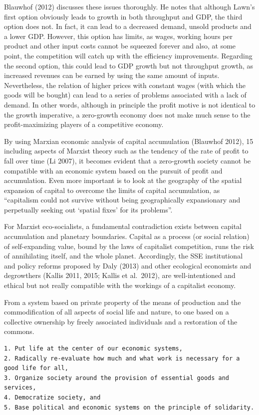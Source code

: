 \documentclass[
]{book}
\begin{document}
Blauwhof (2012) discusses these issues thoroughly. He notes that although Lawn's first option obviously
leads to growth in both throughput and GDP, the third option does not. In fact, it can lead to a decreased demand,
unsold products and a lower GDP. However, this option has limits, as wages, working hours per product and
other input costs cannot be squeezed forever and also, at some point, the competition will catch up with the
efficiency improvements. Regarding the second option, this could lead to GDP growth but not throughput
growth, as increased revenues can be earned by using the same amount of inputs. Nevertheless, the relation of
higher prices with constant wages (with which the goods will be bought) can lead to a series of problems
associated with a lack of demand. In other words, although in principle the profit motive is not identical to the
growth imperative, a zero-growth economy does not make much sense to the profit-maximizing players of a
competitive economy.

By using Marxian economic analysis of capital accumulation (Blauwhof 2012), 15 including aspects of
Marxist theory such as the tendency of the rate of profit to fall over time (Li 2007), it becomes evident that a
zero-growth society cannot be compatible with an economic system based on the pursuit of profit and
accumulation. Even more important is to look at the geography of the spatial expansion of capital to overcome
the limits of capital accumulation, as ``capitalism could not survive without being geographically expansionary
and perpetually seeking out `spatial fixes' for its problems''.

For Marxist eco-socialists, a
fundamental contradiction exists between capital accumulation and planetary boundaries. Capital as a process
(or social relation) of self-expanding value, bound by the laws of capitalist competition, runs the risk of
annihilating itself, and the whole planet.
Accordingly, the SSE institutional and policy
reforms proposed by Daly (2013) and other ecological economists and degrowthers (Kallis 2011, 2015; Kallis
et al.~2012), are well-intentioned and ethical but not really compatible with the workings of a capitalist economy.

From a system based on private property of the means of production and the
commodification of all aspects of social life and nature, to one based on a collective ownership by freely associated individuals and a restoration of the commons.

\begin{verbatim}
1. Put life at the center of our economic systems,  
2. Radically re-evaluate how much and what work is necessary for a good life for all,  
3. Organize society around the provision of essential goods and services,
4. Democratize society, and  
5. Base political and economic systems on the principle of solidarity.   
\end{verbatim}
\end{document}
